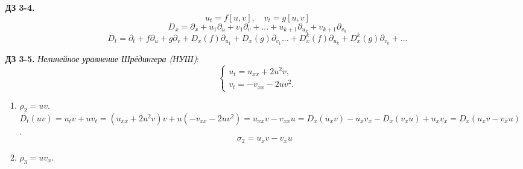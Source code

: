 \documentclass[12pt]{article}
\theoremstyle{definition}
\begin{document}
\begin{itemize}
\begin{proof}
\begin{equation}
\begin{array}{cc}
2(u^2v+\lambda u_x) & -v_xu-vu_x
\end{array}
\right)
\end{equation}
\begin{equation}\label{eq5}
   V_x+[V,U]=\left(
\begin{array}{cc}
0 & v_{xx}+2uv^2\\
u_{xx}+2u^2v & 0
\end{array}
\right)
\end{equation}
Из (\ref{eq4}) и (\ref{eq5}):
\begin{equation}
     \left\{
\begin{array}{l}
u_t=u_{xx}+2u^2v,\\
v_t=-v_{xx}-2uv^2.
\end{array}
\right.
\end{equation}
Для доказательства в обратную сторону нужно переписать все действия в обратном порядке.
\end{proof}
\item[\textbf{ДЗ 3-4.}]
\begin{equation}
    u_t=f[u,v],\quad v_t=g[u,v]
\end{equation}
\begin{equation}
    \boxed{D_x=\partial_x+u_1\partial_u+v_1\partial_v+...+u_{k+1}\partial_{u_k}+v_{k+1}\partial_{v_k}}
\end{equation}
\begin{equation}
    \boxed{D_t=\partial_t+f\partial_u+g\partial_v+D_x(f)\partial_{u_1}+D_x(g)\partial_{v_1}...+D^k_x(f)\partial_{u_k}+D^k_x(g)\partial_{v_k}+...}
\end{equation}
\item[\textbf{ДЗ 3-5.}]
\textit{Нелинейное уравнение Шрёдингера (НУШ)}:
\begin{equation}
     \left\{
\begin{array}{l}
u_t=u_{xx}+2u^2v,\\
v_t=-v_{xx}-2uv^2.
\end{array}
\right.
\end{equation}
\begin{enumerate}
    \item $\rho_2=uv$.\\
    $D_t(uv)=u_tv+uv_t=(u_{xx}+2u^2v)v+u(-v_{xx}-2uv^2)=u_{xx}v-v_{xx}u=D_x(u_xv)-u_xv_x-D_x(v_xu)+u_xv_x=D_x(u_xv-v_xu)$.
\begin{equation}
    \boxed{\sigma_2=u_xv-v_xu}
\end{equation}
\item $\rho_3=uv_x$.\\

\end{enumerate}
\end{itemize}
\end{document}
